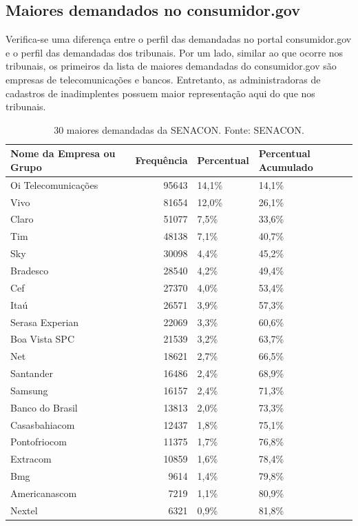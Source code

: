 \documentclass[]{report}
\begin{document}
\subsection{Maiores demandados no
consumidor.gov}\label{maiores-demandados-no-consumidor.gov}

Verifica-se uma diferença entre o perfil das demandadas no portal
consumidor.gov e o perfil das demandadas dos tribunais. Por um lado,
similar ao que ocorre nos tribunais, os primeiros da lista de maiores
demandadas do consumidor.gov são empresas de telecomunicações e bancos.
Entretanto, as administradoras de cadastros de inadimplentes possuem
maior representação aqui do que nos tribunais.

\begin{longtable}{lrll}
\caption{30 maiores demandadas da SENACON. Fonte: SENACON.} \\
  \hline
Nome da Empresa ou Grupo & Frequência & Percentual & Percentual Acumulado \\
  \hline
Oi
Telecomunicações & 95643 & 14,1\% & 14,1\% \\
  Vivo & 81654 & 12,0\% & 26,1\% \\
  Claro & 51077 & 7,5\% & 33,6\% \\
  Tim & 48138 & 7,1\% & 40,7\% \\
  Sky & 30098 & 4,4\% & 45,2\% \\
  Bradesco & 28540 & 4,2\% & 49,4\% \\
  Cef & 27370 & 4,0\% & 53,4\% \\
  Itaú & 26571 & 3,9\% & 57,3\% \\
  Serasa Experian & 22069 & 3,3\% & 60,6\% \\
  Boa Vista SPC & 21539 & 3,2\% & 63,7\% \\
  Net & 18621 & 2,7\% & 66,5\% \\
  Santander & 16486 & 2,4\% & 68,9\% \\
  Samsung & 16157 & 2,4\% & 71,3\% \\
  Banco do Brasil & 13813 & 2,0\% & 73,3\% \\
  Casasbahiacom & 12437 & 1,8\% & 75,1\% \\
  Pontofriocom & 11375 & 1,7\% & 76,8\% \\
  Extracom & 10859 & 1,6\% & 78,4\% \\
  Bmg & 9614 & 1,4\% & 79,8\% \\
  Americanascom & 7219 & 1,1\% & 80,9\% \\
  Nextel & 6321 & 0,9\% & 81,8\% \\

\end{longtable}
\end{document}
